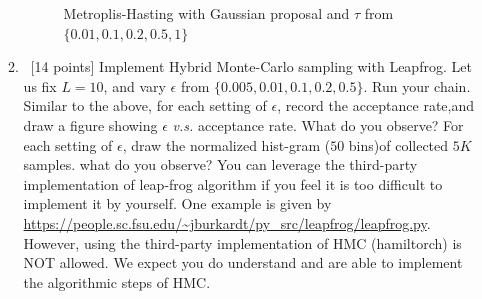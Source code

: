 \documentclass[12pt, fullpage,letterpaper]{article}
\begin{document}
\begin{enumerate}
\begin{enumerate}
{\begin{figure}[H]
\begin{center}
	 \end{center}
	 \caption{{\footnotesize Metroplis-Hasting with Gaussian proposal and  $\tau$ from $\{0.01, 0.1, 0.2, 0.5, 1\}$}}\label{Fig2}    
	\end{figure}	
}		
		\item~[14 points] Implement Hybrid Monte-Carlo sampling with Leapfrog. Let us fix $L = 10$, and vary $\epsilon$ from $\{0.005, 0.01, 0.1, 0.2, 0.5\}$. Run your chain. Similar to the above, for each setting of $\epsilon$, record the acceptance rate,and draw a figure showing $\epsilon$ \textit{v.s.} acceptance rate. What do you observe? For each setting of $\epsilon$, draw the normalized hist-gram ($50$ bins)of collected $5K$ samples. what do you observe? You can leverage the third-party implementation of leap-frog algorithm if you feel it is too difficult to implement it by yourself. One example is given by \url{https://people.sc.fsu.edu/~jburkardt/py_src/leapfrog/leapfrog.py}. However, using the third-party implementation of HMC (\eg hamiltorch) is NOT allowed. We expect you do understand and are able to implement the algorithmic steps of HMC. \\

\end{enumerate}
\end{enumerate}
\end{document}

